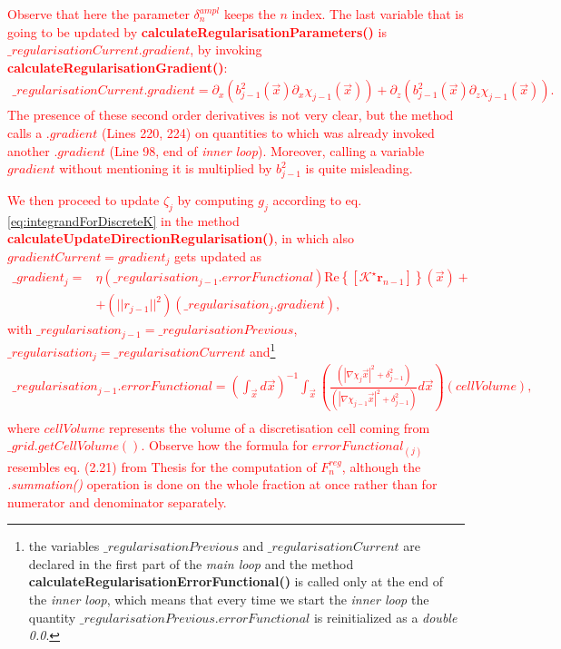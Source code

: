 \documentclass[10pt,a4paper]{article}
\newcommand{\real}[1]{\text{Re} \left\{ #1 \right\}}
\begin{document}
\textcolor{red}{
Observe that here the parameter $\delta^{ampl}_n$ keeps the $n$ index.
}
\textcolor{red}{The last variable that is going to be updated by \textbf{calculateRegularisationParameters()} is $\_regularisationCurrent.gradient$, by invoking \textbf{calculateRegularisationGradient()}:
\begin{align} 
\label{eq:calculateRegularisationGradient}
\_regularisationCurrent.gradient = \partial_x (b^2_{j-1} (\vec{x}) \partial_x \chi_{j-1} (\vec{x}) ) + \partial_z (b^2_{j-1} (\vec{x}) \partial_z \chi_{j-1} (\vec{x}) ).
\end{align}
The presence of these second order derivatives is not very clear, but the method calls a $.gradient$ (Lines 220, 224) on quantities to which was already invoked another $.gradient$ (Line 98, end of \textit{inner loop}). 
Moreover, calling a variable $gradient$ without mentioning it is multiplied by $b_{j-1}^2$ is quite misleading.
}
\newline

\textcolor{red}{
We then proceed to update $\zeta_j$ by computing $g_j$ according to eq. \eqref{eq:integrandForDiscreteK} in the method \textbf{calculateUpdateDirectionRegularisation()}, in which also $gradientCurrent = gradient_j$ gets updated as 
\begin{align}
\_gradient_j = &\eta (\_regularisation_{j-1}.errorFunctional)\real{[\mathcal{K}^\star\mathbf{r}_{n-1}]}(\vec{x}) + \\
&+ (||r_{j-1}||^2)( \_regularisation_j.gradient),
\end{align}
with $\_regularisation_{j-1} =\_regularisationPrevious$,  $\_regularisation_{j} =\_regularisationCurrent$ and\footnote{the variables $\_regularisationPrevious$ and $\_regularisationCurrent$ are declared in the first part of the \textit{main loop} and the method \textbf{calculateRegularisationErrorFunctional()} is called only at the end of the \textit{inner loop}, which means that every time we start the \textit{inner loop} the quantity $\_regularisationPrevious.errorFunctional$ is reinitialized as a \textit{double  0.0}.}
\begin{align}
\_regularisation_{j-1}.errorFunctional =  (\int_{\vec{x}} d\vec{x})^{-1} \int_{\vec{x}} \left(\frac{(|\nabla \chi_j\vec{x}|^2 +\delta^2_{j-1})}{(|\nabla \chi_{j-1}\vec{x}|^2 +\delta^2_{j-1})}  d\vec{x}\right) (cellVolume), \\
\tag*{( calculateRegularisationErrorFunctional() )}
\end{align}
where $cellVolume$ represents the volume of a discretisation cell coming from $\_grid.getCellVolume()$.
Observe how the formula for $errorFunctional_{(j)} $ resembles eq. (2.21) from Thesis for the computation of $F^{reg}_n$, although the \textit{.summation()} operation is done on the whole fraction at once rather than for numerator and denominator separately.
}
\newline
\end{document}
